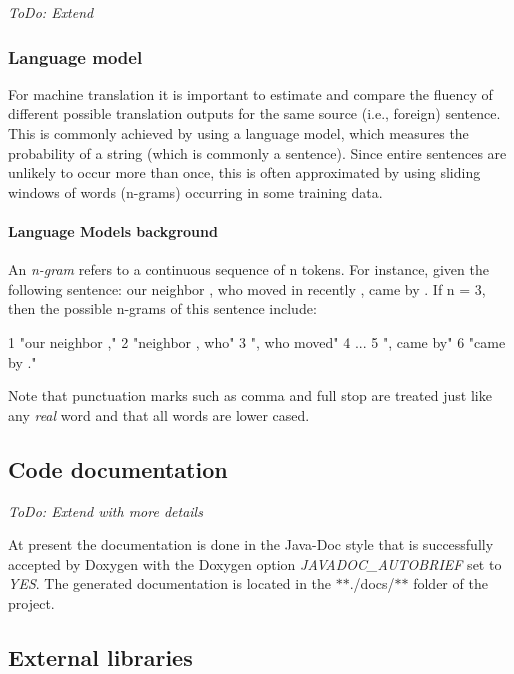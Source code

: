{\itshape To\+Do\+: Extend}

\subsubsection*{Language model}

For machine translation it is important to estimate and compare the fluency of different possible translation outputs for the same source (i.\+e., foreign) sentence. This is commonly achieved by using a language model, which measures the probability of a string (which is commonly a sentence). Since entire sentences are unlikely to occur more than once, this is often approximated by using sliding windows of words (n-\/grams) occurring in some training data.

\paragraph*{Language Models background}

An {\itshape n-\/gram} refers to a continuous sequence of n tokens. For instance, given the following sentence\+: {\ttfamily our neighbor , who moved in recently , came by .} If n = 3, then the possible n-\/grams of this sentence include\+:


\begin{DoxyCode}
1 "our neighbor ,"
2 "neighbor , who"
3 ", who moved"
4 ...
5 ", came by"
6 "came by ."
\end{DoxyCode}
 Note that punctuation marks such as comma and full stop are treated just like any {\itshape real} word and that all words are lower cased.

\subsection*{Code documentation}

{\itshape To\+Do\+: Extend with more details}

At present the documentation is done in the Java-\/\+Doc style that is successfully accepted by Doxygen with the Doxygen option {\itshape J\+A\+V\+A\+D\+O\+C\+\_\+\+A\+U\+T\+O\+B\+R\+I\+E\+F} set to {\itshape Y\+E\+S}. The generated documentation is located in the $\ast$$\ast$./docs/$\ast$$\ast$ folder of the project.

\subsection*{External libraries}

